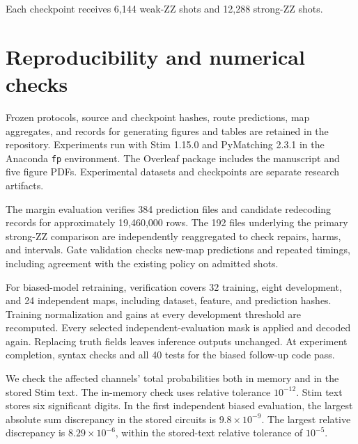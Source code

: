 \documentclass[aps,prd,12pt,twocolumn,superscriptaddress,floatfix]{revtex4-2}
\begin{document}
Each checkpoint receives 6,144 weak-ZZ shots and 12,288 strong-ZZ shots.

\section{Reproducibility and numerical checks}
\label{app:reproducibility}


Frozen protocols, source and checkpoint hashes, route predictions, map aggregates, and records for generating figures and tables are retained in the repository. Experiments run with Stim 1.15.0 and PyMatching 2.3.1 in the Anaconda \texttt{fp} environment. The Overleaf package includes the manuscript and five figure PDFs. Experimental datasets and checkpoints are separate research artifacts.

The margin evaluation verifies 384 prediction files and candidate redecoding records for approximately 19,460,000 rows. The 192 files underlying the primary strong-ZZ comparison are independently reaggregated to check repairs, harms, and intervals. Gate validation checks new-map predictions and repeated timings, including agreement with the existing policy on admitted shots.

For biased-model retraining, verification covers 32 training, eight development, and 24 independent maps, including dataset, feature, and prediction hashes. Training normalization and gains at every development threshold are recomputed. Every selected independent-evaluation mask is applied and decoded again. Replacing truth fields leaves inference outputs unchanged. At experiment completion, syntax checks and all 40 tests for the biased follow-up code pass.

We check the affected channels' total probabilities both in memory and in the stored Stim text. The in-memory check uses relative tolerance \(10^{-12}\). Stim text stores six significant digits. In the first independent biased evaluation, the largest absolute sum discrepancy in the stored circuits is \(9.8\times10^{-9}\). The largest relative discrepancy is \(8.29\times10^{-6}\), within the stored-text relative tolerance of \(10^{-5}\).
\end{document}
